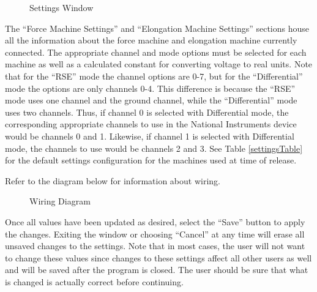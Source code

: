 \documentclass[12pt,letterpaper, USenglish]{article}
\theoremstyle{definition}
\numberwithin{theorem}{section}
\numberwithin{lemma}{section}
\numberwithin{corollary}{section}
\numberwithin{definition}{section}
\numberwithin{example}{section}
\numberwithin{equation}{theorem}
\begin{document}
\begin{figure}[H]
    \centering
    \hspace{1em}
    \caption{Settings Window}
\end{figure}
The ``Force Machine Settings'' and ``Elongation Machine Settings'' sections house all the information about the force machine and elongation machine currently connected. The appropriate channel and mode options must be selected for each machine as well as a calculated constant for converting voltage to real units. Note that for the ``RSE'' mode the channel options are 0-7, but for the ``Differential'' mode the options are only channels 0-4. This difference is because the ``RSE'' mode uses one channel and the ground channel, while the ``Differential'' mode uses two channels. Thus, if channel 0 is selected with Differential mode, the corresponding appropriate channels to use in the National Instruments device would be channels 0 and 1. Likewise, if channel 1 is selected with Differential mode, the channels to use would be channels 2 and 3. See Table \ref{settingsTable} for the default settings configuration for the machines used at time of release.

Refer to the diagram below for information about wiring.
\begin{figure}[H]
    \centering
    \caption{Wiring Diagram}
\end{figure}

Once all values have been updated as desired, select the ``Save'' button to apply the changes. Exiting the window or choosing ``Cancel'' at any time will erase all unsaved changes to the settings. 
Note that in most cases, the user will not want to change these values since changes to these settings affect all other users as well and will be saved after the program is closed.
The user should be sure that what is changed is actually correct before continuing.
\end{document}
